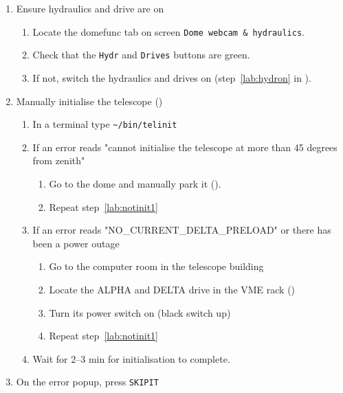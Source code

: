 \documentclass[11pt,fleqn,a4paper]{book}
\def\home{\textasciitilde{}}
\begin{document}
\begin{enumerate}
    \item Ensure hydraulics and drive are on
        \begin{enumerate}
            \item Locate the \gls{domefunc} tab on screen \texttt{Dome webcam \& hydraulics}. 
            \item Check that the \texttt{Hydr} and \texttt{Drives} buttons are green.
            \item If not, switch the hydraulics and drives on (step~\ref{lab:hydron} in ).
        \end{enumerate}
    \item Manually initialise the telescope ()
        \begin{enumerate}
            \item\label{lab:notinit1} 
                In a terminal type \texttt{\home/bin/telinit}
            \item If an error reads "cannot initialise the 
                telescope at more than 45 degrees from zenith"
                \begin{enumerate}
                    \item Go to the dome and manually park it (). 
                    \item Repeat step~\ref{lab:notinit1}
                \end{enumerate}
            \item If an error reads "NO\_CURRENT\_DELTA\_PRELOAD" or there has been a power outage
                \begin{enumerate}
                    \item Go to the computer room in the telescope building
                    \item Locate the ALPHA and DELTA drive in the VME rack ()
                    \item Turn its power switch on (black switch up)
                    \item Repeat step~\ref{lab:notinit1}
                \end{enumerate}
            \item Wait for 2--3 min for initialisation to complete.
        \end{enumerate}
    \item On the error popup, press \texttt{SKIPIT}
\end{enumerate}
\end{document}
